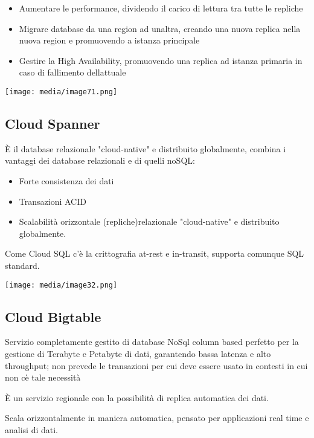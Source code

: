 \begin{itemize}
\item
  Aumentare le performance, dividendo il carico di lettura tra tutte le
  repliche
\item
  Migrare database da una region ad un\textquotesingle altra, creando
  una nuova replica nella nuova region e promuovendo a istanza
  principale
\item
  Gestire la High Availability, promuovendo una replica ad istanza
  primaria in caso di fallimento dell\textquotesingle attuale
\end{itemize}

\texttt{[image: media/image71.png]}

\subsection{Cloud Spanner}\label{cloud-spanner}

È il database relazionale "cloud-native" e distribuito globalmente,
combina i vantaggi dei database relazionali e di quelli noSQL:

\begin{itemize}
\item
  Forte consistenza dei dati
\item
  Transazioni ACID
\item
  Scalabilità orizzontale (repliche)relazionale "cloud-native" e
  distribuito globalmente.
\end{itemize}

Come Cloud SQL c'è la crittografia at-rest e in-transit, supporta
comunque SQL standard.

\texttt{[image: media/image32.png]}

\subsection{Cloud Bigtable}\label{cloud-bigtable}

Servizio completamente gestito di database NoSql column based perfetto
per la gestione di Terabyte e Petabyte di dati, garantendo bassa latenza
e alto throughput; non prevede le transazioni per cui deve essere usato
in contesti in cui non c\textquotesingle è tale necessità

È un servizio regionale con la possibilità di replica automatica dei
dati.

Scala orizzontalmente in maniera automatica, pensato per applicazioni
real time e analisi di dati.

